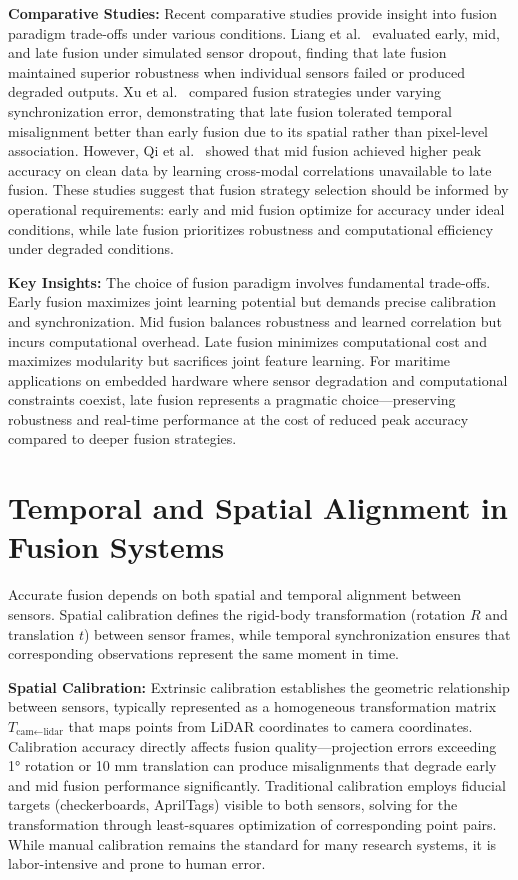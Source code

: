 \documentclass{erauthesis}
\begin{document}
\textbf{Comparative Studies:} Recent comparative studies provide insight into fusion paradigm trade-offs under various conditions. Liang et al.~\cite{liang2022} evaluated early, mid, and late fusion under simulated sensor dropout, finding that late fusion maintained superior robustness when individual sensors failed or produced degraded outputs. Xu et al.~\cite{xu2023} compared fusion strategies under varying synchronization error, demonstrating that late fusion tolerated temporal misalignment better than early fusion due to its spatial rather than pixel-level association. However, Qi et al.~\cite{qi2021} showed that mid fusion achieved higher peak accuracy on clean data by learning cross-modal correlations unavailable to late fusion. These studies suggest that fusion strategy selection should be informed by operational requirements: early and mid fusion optimize for accuracy under ideal conditions, while late fusion prioritizes robustness and computational efficiency under degraded conditions.

\textbf{Key Insights:} The choice of fusion paradigm involves fundamental trade-offs. Early fusion maximizes joint learning potential but demands precise calibration and synchronization. Mid fusion balances robustness and learned correlation but incurs computational overhead. Late fusion minimizes computational cost and maximizes modularity but sacrifices joint feature learning. For maritime applications on embedded hardware where sensor degradation and computational constraints coexist, late fusion represents a pragmatic choice—preserving robustness and real-time performance at the cost of reduced peak accuracy compared to deeper fusion strategies.


\section{Temporal and Spatial Alignment in Fusion Systems}

Accurate fusion depends on both spatial and temporal alignment between sensors. Spatial calibration defines the rigid-body transformation (rotation $R$ and translation $t$) between sensor frames, while temporal synchronization ensures that corresponding observations represent the same moment in time.

\textbf{Spatial Calibration:} Extrinsic calibration establishes the geometric relationship between sensors, typically represented as a homogeneous transformation matrix $T_{\text{cam} \leftarrow \text{lidar}}$ that maps points from LiDAR coordinates to camera coordinates. Calibration accuracy directly affects fusion quality—projection errors exceeding 1° rotation or 10 mm translation can produce misalignments that degrade early and mid fusion performance significantly. Traditional calibration employs fiducial targets (checkerboards, AprilTags) visible to both sensors, solving for the transformation through least-squares optimization of corresponding point pairs. While manual calibration remains the standard for many research systems, it is labor-intensive and prone to human error.
\end{document}
